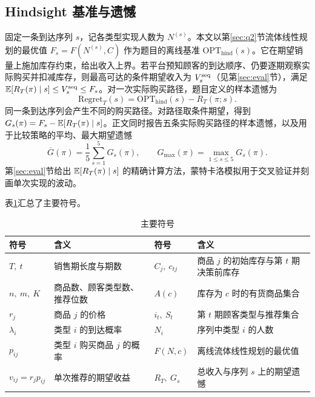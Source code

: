 \subsection{Hindsight 基准与遗憾}
固定一条到达序列 $s$，记各类型实现人数为 $N^{(s)}$。本文以第\ref{sec:q2}节流体线性规划的最优值 $F_s=F(N^{(s)},C)$ 作为题目的离线基准 $\mathrm{OPT}_{\mathrm{hind}}(s)$。它在期望销量上施加库存约束，给出收入上界。若平台预知顾客的到达顺序、仍要逐期观察实际购买并扣减库存，则最高可达的条件期望收入为 $V_s^{\mathrm{seq}}$（见第\ref{sec:eval}节），满足 $\mathbb E[R_T(\pi)\mid s]\le V_s^{\mathrm{seq}}\le F_s$。对一次实际购买路径，题目定义的样本遗憾为
\begin{equation}
\mathrm{Regret}_T(s)=\mathrm{OPT}_{\mathrm{hind}}(s)-R_T(\pi;s).
\end{equation}
同一条到达序列会产生不同的购买路径。对路径取条件期望，得到 $G_s(\pi)=F_s-\mathbb E[R_T(\pi)\mid s]$。正文同时报告五条实际购买路径的样本遗憾，以及用于比较策略的平均、最大期望遗憾
\begin{equation}
\overline G(\pi)=\frac15\sum_{s=1}^{5}G_s(\pi),\qquad G_{\max}(\pi)=\max_{1\le s\le5}G_s(\pi).
\label{eq:avgmax}
\end{equation}
第\ref{sec:eval}节给出 $\mathbb E[R_T(\pi)\mid s]$ 的精确计算方法，蒙特卡洛模拟用于交叉验证并刻画单次实现的波动。

表\ref{tab:notation}汇总了主要符号。

\begin{table}[htbp]
\centering\small
\caption{主要符号}\label{tab:notation}
\begin{tabularx}{\linewidth}{@{}lX@{\qquad}lX@{}}
\toprule
符号 & 含义 & 符号 & 含义\\
\midrule
$T,\ t$ & 销售期长度与期数 & $C_j,\ c_{tj}$ & 商品 $j$ 的初始库存与第 $t$ 期决策前库存\\
$n,\ m,\ K$ & 商品数、顾客类型数、推荐位数 & $A(c)$ & 库存为 $c$ 时的有货商品集合\\
$r_j$ & 商品 $j$ 的价格 & $i_t,\ S_t$ & 第 $t$ 期顾客类型与推荐集合\\
$\lambda_i$ & 类型 $i$ 的到达概率 & $N_i$ & 序列中类型 $i$ 的人数\\
$p_{ij}$ & 类型 $i$ 购买商品 $j$ 的概率 & $F(N,c)$ & 离线流体线性规划的最优值\\
$v_{ij}=r_jp_{ij}$ & 单次推荐的期望收益 & $R_T,\ G_s$ & 总收入与序列 $s$ 上的期望遗憾\\
\bottomrule
\end{tabularx}
\end{table}

